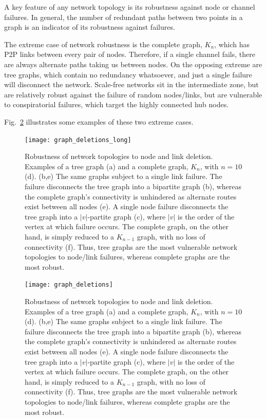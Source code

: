 A key feature of any network topology is its robustness against node or channel failures. In general, the number of redundant paths between two points in a graph is an indicator of its robustness against failures.

The extreme case of network robustness is the complete graph, $K_n$, which has P2P links between every pair of nodes. Therefore, if a single channel fails, there are always alternate paths taking us between nodes. On the opposing extreme are tree graphs, which contain no redundancy whatsoever, and just a single failure will disconnect the network. Scale-free networks sit in the intermediate zone, but are relatively robust against the failure of random nodes/links, but are vulnerable to conspiratorial failures, which target the highly connected hub nodes.

Fig.~\ref{fig:graph_deletions} illustrates some examples of these two extreme cases.

\pubmode
	\begin{figure}[!htbp]
	\texttt{[image: graph\_deletions\_long]}
	\caption{Robustness of network topologies to node and link deletion. Examples of a tree graph (a) and a complete graph, $K_n$, with \mbox{$n=10$} (d). (b,e) The same graphs subject to a single link failure. The failure disconnects the tree graph into a bipartite graph (b), whereas the complete graph's connectivity is unhindered as alternate routes exist between all nodes (e). A single node failure disconnects the tree graph into a $|v|$-partite graph (c), where $|v|$ is the order of the vertex at which failure occurs. The complete graph, on the other hand, is simply reduced to a $K_{n-1}$ graph, with no loss of connectivity (f). Thus, tree graphs are the most vulnerable network topologies to node/link failures, whereas complete graphs are the most robust.}\label{fig:graph_deletions}
	\end{figure}
\else
	\begin{figure}[!htbp]
	\texttt{[image: graph\_deletions]}
	\caption{Robustness of network topologies to node and link deletion. Examples of a tree graph (a) and a complete graph, $K_n$, with \mbox{$n=10$} (d). (b,e) The same graphs subject to a single link failure. The failure disconnects the tree graph into a bipartite graph (b), whereas the complete graph's connectivity is unhindered as alternate routes exist between all nodes (e). A single node failure disconnects the tree graph into a $|v|$-partite graph (c), where $|v|$ is the order of the vertex at which failure occurs. The complete graph, on the other hand, is simply reduced to a $K_{n-1}$ graph, with no loss of connectivity (f). Thus, tree graphs are the most vulnerable network topologies to node/link failures, whereas complete graphs are the most robust.}\label{fig:graph_deletions}
	\end{figure}
\fi